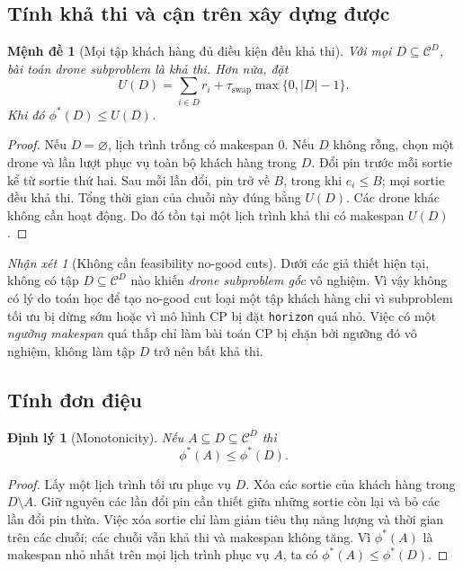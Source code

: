 \documentclass[11pt,a4paper]{article}
\theoremstyle{definition}
\theoremstyle{plain}
\newtheorem{proposition}{Mệnh đề}[section]
\newtheorem{theorem}{Định lý}[section]
\theoremstyle{remark}
\newtheorem{remark}{Nhận xét}[section]
\newcommand{\CD}{\mathcal C^D}
\newcommand{\sw}{\tau_{\mathrm{swap}}}
\newcommand{\opt}{\phi^*}
\begin{document}
\subsection{Tính khả thi và cận trên xây dựng được}
\begin{proposition}[Mọi tập khách hàng đủ điều kiện đều khả thi]\label{prop:feasible}
Với mọi $D\subseteq\CD$, bài toán drone subproblem là khả thi. Hơn nữa, đặt
\begin{equation}\label{eq:constructub}
U(D)=\sum_{i\in D}r_i+\sw\max\{0,|D|-1\}.
\end{equation}
Khi đó $\opt(D)\le U(D)$.
\end{proposition}
\begin{proof}
Nếu $D=\varnothing$, lịch trình trống có makespan $0$. Nếu $D$ không rỗng, chọn một drone và lần lượt phục vụ toàn bộ khách hàng trong $D$. Đổi pin trước mỗi sortie kể từ sortie thứ hai. Sau mỗi lần đổi, pin trở về $B$, trong khi $e_i\le B$; mọi sortie đều khả thi. Tổng thời gian của chuỗi này đúng bằng $U(D)$. Các drone khác không cần hoạt động. Do đó tồn tại một lịch trình khả thi có makespan $U(D)$.
\end{proof}
\begin{remark}[Không cần feasibility no-good cuts]
Dưới các giả thiết hiện tại, không có tập $D\subseteq\CD$ nào khiến \emph{drone subproblem gốc} vô nghiệm. Vì vậy không có lý do toán học để tạo no-good cut loại một tập khách hàng chỉ vì subproblem tối ưu bị dừng sớm hoặc vì mô hình CP bị đặt \texttt{horizon} quá nhỏ. Việc có một \emph{ngưỡng makespan} quá thấp chỉ làm bài toán CP bị chặn bởi ngưỡng đó vô nghiệm, không làm tập $D$ trở nên bất khả thi.
\end{remark}

\subsection{Tính đơn điệu}
\begin{theorem}[Monotonicity]\label{thm:monotone}
Nếu $A\subseteq D\subseteq\CD$ thì
\begin{equation}\label{eq:monotone}
\opt(A)\le\opt(D).
\end{equation}
\end{theorem}
\begin{proof}
Lấy một lịch trình tối ưu phục vụ $D$. Xóa các sortie của khách hàng trong $D\setminus A$. Giữ nguyên các lần đổi pin cần thiết giữa những sortie còn lại và bỏ các lần đổi pin thừa. Việc xóa sortie chỉ làm giảm tiêu thụ năng lượng và thời gian trên các chuỗi; các chuỗi vẫn khả thi và makespan không tăng. Vì $\opt(A)$ là makespan nhỏ nhất trên mọi lịch trình phục vụ $A$, ta có $\opt(A)\le\opt(D)$.
\end{proof}
\end{document}
